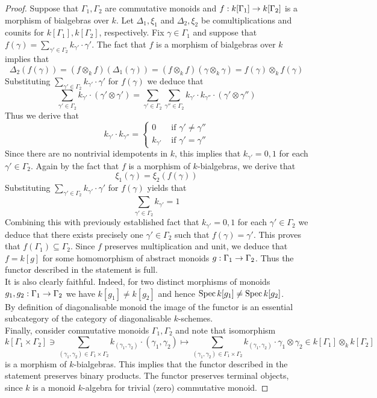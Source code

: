 \begin{proof}
Suppose that $\Gamma_1, \Gamma_2$ are commutative monoids and $f:k[\Gamma_1]\rightarrow k[\Gamma_2]$ is a morphism of bialgebras over $k$. Let $\Delta_1,\xi_1$ and $\Delta_2,\xi_2$ be comultiplications and counits for $k[\Gamma_1],k[\Gamma_2]$, respectively. Fix $\gamma\in \Gamma_1$ and suppose that $f(\gamma) = \sum_{\gamma'\in \Gamma_2}k_{\gamma'}\cdot \gamma'$. The fact that $f$ is a morphism of bialgebras over $k$ implies that
$$\Delta_2\left(f\left( \gamma\right)\right) = \left(f\otimes_k f\right)\left(\Delta_1(\gamma)\right) = \left(f\otimes_kf\right)(\gamma\otimes_k\gamma) = f(\gamma)\otimes_kf(\gamma)$$
Substituting $\sum_{\gamma'\in \Gamma_2}k_{\gamma'}\cdot \gamma'$ for $f(\gamma)$ we deduce that
$$\sum_{\gamma'\in \Gamma_2}k_{\gamma'}\cdot \left(\gamma'\otimes \gamma'\right) = \sum_{\gamma'\in \Gamma_2}\sum_{\gamma''\in \Gamma_2}k_{\gamma'}\cdot k_{\gamma''}\cdot \left(\gamma'\otimes \gamma''\right)$$
Thus we derive that
$$k_{\gamma'}\cdot k_{\gamma''} = \begin{cases} 0 & \mbox{ if }\gamma'\neq \gamma''\\
k_{\gamma'} & \mbox{ if }\gamma'=\gamma''
\end{cases}$$
Since there are no nontrivial idempotents in $k$, this implies that $k_{\gamma'} = 0,1$ for each $\gamma'\in \Gamma_2$. Again by the fact that $f$ is a morphism of $k$-bialgebras, we derive that
$$\xi_1(\gamma) = \xi_2\left(f(\gamma)\right)$$
Substituting $\sum_{\gamma'\in \Gamma_2}k_{\gamma'}\cdot \gamma'$ for $f(\gamma)$ yields that
$$\sum_{\gamma'\in \Gamma_2}k_{\gamma'} = 1$$
Combining this with previously established fact that $k_{\gamma'}=0,1$ for each $\gamma'\in \Gamma_2$ we deduce that there exists precisely one $\gamma'\in \Gamma_2$ such that $f(\gamma) = \gamma'$. This proves that $f(\Gamma_1)\subseteq \Gamma_2$. Since $f$ preserves multiplication and unit, we deduce that $f = k[g]$ for some homomorphism of abstract monoids $g:\Gamma_1\rightarrow \Gamma_2$. Thus the functor described in the statement is full.\\
It is also clearly faithful. Indeed, for two distinct morphisms of monoids $g_1,g_2:\Gamma_1\rightarrow \Gamma_2$ we have $k[g_1]\neq k[g_2]$ and hence $\mathrm{Spec}\, k[g_1] \neq \mathrm{Spec}\, k[g_2]$.\\
By definition of diagonalisable monoid the image of the functor is an essential subcategory of the category of diagonalisable $k$-schemes.\\
Finally, consider commutative monoids $\Gamma_1,\Gamma_2$ and note that isomorphism
$$k[\Gamma_1\times \Gamma_2] \ni \sum_{(\gamma_1,\gamma_2)\in \Gamma_1\times \Gamma_2}k_{(\gamma_1,\gamma_2)}\cdot (\gamma_1,\gamma_2) \mapsto \sum_{(\gamma_1,\gamma_2)\in \Gamma_1\times \Gamma_2}k_{(\gamma_1,\gamma_2)}\cdot \gamma_1\otimes \gamma_2 \in k[\Gamma_1]\otimes_kk[\Gamma_2]$$
is a morphism of $k$-bialgebras. This implies that the functor described in the statement preserves binary products. The functor preserves terminal objects, since $k$ is a monoid $k$-algebra for trivial (zero) commutative monoid.
\end{proof}

